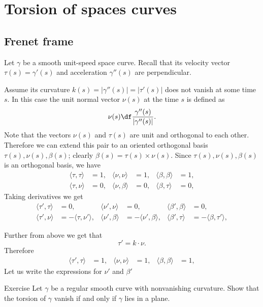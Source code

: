 \chapter{Torsion of spaces curves}

\section{Frenet frame}

Let $\gamma$ be a smooth unit-speed space curve.
Recall that its velocity vector $\tau(s)=\gamma'(s)$ and acceleration $\gamma''(s)$ are perpendicular.

Assume its curvature $k(s)=|\gamma''(s)|=|\tau'(s)|$ does not vanish at some time $s$.
In this case the unit normal vector $\nu(s)$ at the time $s$ is defined as
\[\nu(s)\df \frac{\gamma''(s)}{|\gamma''(s)|}.\]
Note that the vectors $\nu(s)$ and $\tau(s)$ are unit and orthogonal to each other.
Therefore we can extend this pair to an oriented orthogonal basis $\tau(s),\nu(s),\beta(s)$; clearly $\beta(s)=\tau(s)\times\nu(s)$.
Since $\tau(s),\nu(s),\beta(s)$ is an orthogonal basis, we have
\begin{align*}
\langle\tau,\tau\rangle&=1,
&
\langle\nu,\nu\rangle&=1,
&
\langle\beta,\beta\rangle&=1,
\\
\langle\tau,\nu\rangle&=0,
&
\langle\nu,\beta\rangle&=0,
&
\langle\beta,\tau\rangle&=0,
\end{align*}
Taking derivatives we get 
\begin{align*}
\langle\tau',\tau\rangle&=0,
&
\langle\nu',\nu\rangle&=0,
&
\langle\beta',\beta\rangle&=0,
\\
\langle\tau',\nu\rangle&=-\langle\tau,\nu'\rangle,
&
\langle\nu',\beta\rangle&=-\langle\nu',\beta\rangle,
&
\langle\beta',\tau\rangle&=-\langle\beta,\tau'\rangle,
\end{align*}

Further from above we get that 
\[\tau'=k\cdot \nu.\]
Therefore 
\begin{align*}
\langle\tau',\tau\rangle&=1,
&
\langle\nu,\nu\rangle&=1,
&
\langle\beta,\beta\rangle&=1,
\end{align*}
Let us write the expressions for $\nu'$ and $\beta'$

\begin{thm}{Exercise}
Let $\gamma$ be a regular smooth curve with nonvanishing curvature.
Show that the torsion of $\gamma$ vanish if and only if $\gamma$ lies in a plane.
\end{thm}

